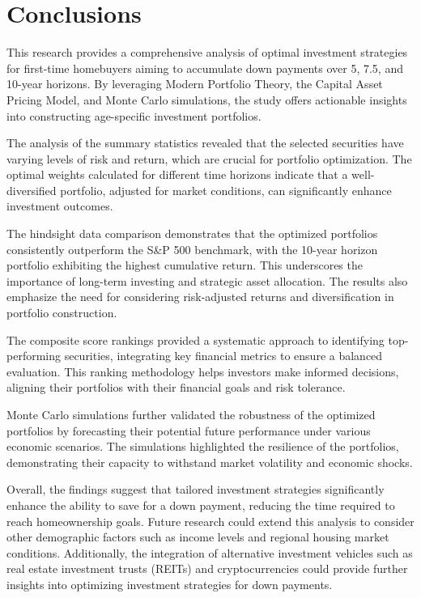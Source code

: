 \section{Conclusions}

This research provides a comprehensive analysis of optimal investment strategies for first-time homebuyers aiming to accumulate down payments over 5, 7.5, and 10-year horizons. By leveraging Modern Portfolio Theory, the Capital Asset Pricing Model, and Monte Carlo simulations, the study offers actionable insights into constructing age-specific investment portfolios.

The analysis of the summary statistics revealed that the selected securities have varying levels of risk and return, which are crucial for portfolio optimization. The optimal weights calculated for different time horizons indicate that a well-diversified portfolio, adjusted for market conditions, can significantly enhance investment outcomes.

The hindsight data comparison demonstrates that the optimized portfolios consistently outperform the S&P 500 benchmark, with the 10-year horizon portfolio exhibiting the highest cumulative return. This underscores the importance of long-term investing and strategic asset allocation. The results also emphasize the need for considering risk-adjusted returns and diversification in portfolio construction.

The composite score rankings provided a systematic approach to identifying top-performing securities, integrating key financial metrics to ensure a balanced evaluation. This ranking methodology helps investors make informed decisions, aligning their portfolios with their financial goals and risk tolerance.

Monte Carlo simulations further validated the robustness of the optimized portfolios by forecasting their potential future performance under various economic scenarios. The simulations highlighted the resilience of the portfolios, demonstrating their capacity to withstand market volatility and economic shocks.

Overall, the findings suggest that tailored investment strategies significantly enhance the ability to save for a down payment, reducing the time required to reach homeownership goals. Future research could extend this analysis to consider other demographic factors such as income levels and regional housing market conditions. Additionally, the integration of alternative investment vehicles such as real estate investment trusts (REITs) and cryptocurrencies could provide further insights into optimizing investment strategies for down payments.

\newpage